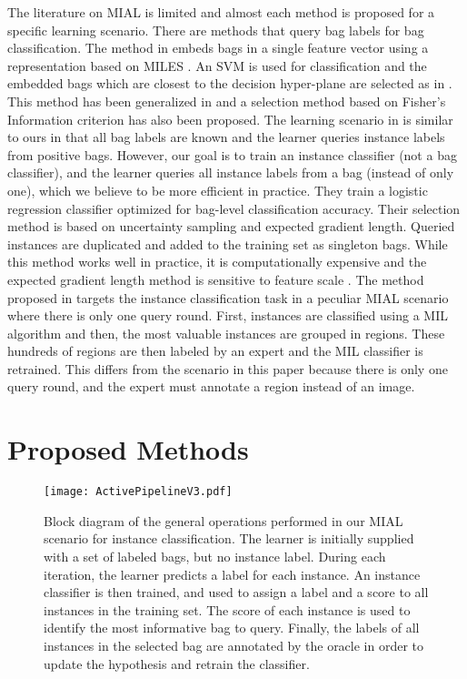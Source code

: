 \documentclass{article}
\begin{document}
The literature on MIAL is limited and almost each method is proposed for a specific learning scenario. There are methods that query bag labels for bag classification. The method in \cite{Meessen2007} embeds bags in a single feature vector using a representation based on MILES \cite{Chen2006}. An SVM is used for classification and the embedded bags which are closest to the decision hyper-plane are selected as in \cite{Tong2001}. This method has been generalized in \cite{Zhang2010AMIL} and a selection method based on Fisher's Information criterion has also been proposed. The learning scenario in \cite{Settles2008} is similar to ours in that all bag labels are known and the learner queries instance labels from positive bags. However, our goal is to train an instance classifier (not a bag classifier), and the learner queries all instance labels from a bag (instead of only one), which we believe to be more efficient in practice. They train a logistic regression classifier optimized for bag-level classification accuracy. Their selection method is based on uncertainty sampling and expected gradient length. Queried instances are duplicated and added to the training set as singleton bags. While this method works well in practice, it is computationally expensive and the expected gradient length method is sensitive to feature scale \cite{Settles2009survey}. The method proposed in \cite{Melendez2016AMIL} targets the instance classification task in a peculiar MIAL scenario where there is only one query round. First, instances are classified using a MIL algorithm \cite{Melendez2014novel} and then, the most valuable instances are grouped in regions. These hundreds of regions are then labeled by an expert and the MIL classifier is retrained. This differs from the scenario in this paper because there is only one query round, and the expert must annotate a region instead of an image.  



\section{Proposed Methods}
\label{Section:ProposedMethods}

\begin{figure*}[!t]
\centering
\texttt{[image: ActivePipelineV3.pdf]}
\caption{Block diagram of the general operations performed in our MIAL scenario for instance classification. The learner is initially supplied with a set of labeled bags, but no instance label. During each iteration, the learner predicts a label for each instance. An instance classifier is then trained, and used to assign a label and a score to all instances in the training set. The score of each instance is used to identify the most informative bag to query. Finally, the labels of all instances in the selected bag are annotated by the oracle in order to update the hypothesis and retrain the classifier.}
\label{Fig:TOP}
\end{figure*}
\end{document}
